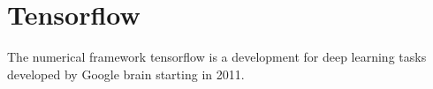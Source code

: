 \section{Tensorflow}\label{sec:tensorflow}

The numerical framework tensorflow is a development for deep learning tasks developed by Google brain starting in 2011. 